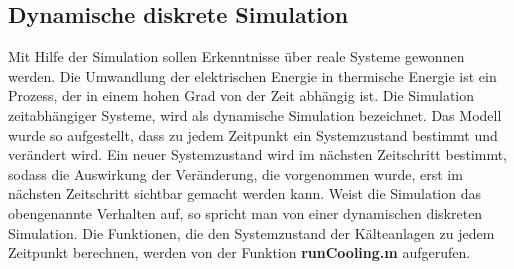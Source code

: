 \subsection*{Dynamische diskrete Simulation}

Mit Hilfe der Simulation sollen Erkenntnisse \"uber reale Systeme gewonnen
werden. Die Umwandlung der elektrischen Energie in thermische Energie ist ein
Prozess, der in einem hohen Grad von der Zeit abh\"angig ist. Die Simulation
zeitabh\"angiger Systeme, wird als dynamische Simulation bezeichnet. Das Modell
wurde so aufgestellt, dass zu jedem Zeitpunkt ein Systemzustand bestimmt und
ver\"andert wird. Ein neuer Systemzustand wird im n\"achsten Zeitschritt
bestimmt, sodass die Auswirkung der Ver\"anderung, die vorgenommen wurde, erst
im n\"achsten Zeitschritt sichtbar gemacht werden kann. Weist die Simulation das
obengenannte Verhalten auf, so spricht man von einer dynamischen diskreten
Simulation. Die Funktionen, die den Systemzustand der K\"alteanlagen zu jedem
Zeitpunkt berechnen, werden von der Funktion \textbf{runCooling.m} aufgerufen.

